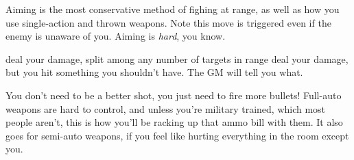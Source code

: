 Aiming is the most conservative method of fighing at range, as well as
how you use single-action and thrown weapons. Note this move is
triggered even if the enemy is unaware of you. Aiming is \emph{hard},
you know.

%
%
%
%
%


{deal your damage, split among any number of targets in range}
{deal your damage, but you hit something you shouldn't have. The GM will tell you what.}

You don't need to be a better shot, you just need to fire more
bullets! Full-auto weapons are hard to control, and unless you're
military trained, which most people aren't, this is how you'll be
racking up that ammo bill with them. It also goes for semi-auto
weapons, if you feel like hurting everything in the room except you.

%
%
%
%
%
%
%


